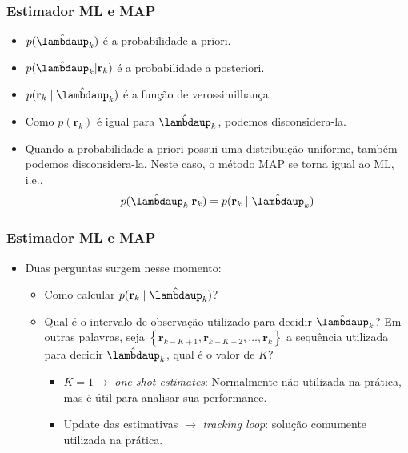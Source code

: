 \begin{frame}[t]
    \frametitle{Estimador ML e MAP}

    \begin{itemize}
        \item \(p(\hat{\boldsymbol{\lambdaup}}_k)\) é a probabilidade a priori.
        \item \(p(\hat{\boldsymbol{\lambdaup}}_k | \mathbf{r}_k)\) é a probabilidade a posteriori.
        \item \(p(\mathbf{r}_k \mid \hat{\boldsymbol{\lambdaup}}_k)\) é a função de verossimilhança.
    \end{itemize}

    \begin{itemize}
        \item Como \(p(\mathbf{r}_k)\) é igual para \(\hat{\boldsymbol{\lambdaup}}_k\), podemos disconsidera-la.
        \item Quando a probabilidade a priori possui uma distribuição uniforme, também podemos disconsidera-la. Neste caso, o método MAP se torna igual ao ML, i.e.,
        \begin{align}
            p(\hat{\boldsymbol{\lambdaup}}_k | \mathbf{r}_k) = p(\mathbf{r}_k \mid \hat{\boldsymbol{\lambdaup}}_k)
        \end{align}
    \end{itemize}
\end{frame}

\begin{frame}[t]
    \frametitle{Estimador ML e MAP}
    \begin{itemize}
        \item Duas perguntas surgem nesse momento:
        \begin{itemize}
            \item Como calcular \(p(\mathbf{r}_k \mid \hat{\boldsymbol{\lambdaup}}_k)\)?
            \item Qual é o intervalo de observação utilizado para decidir \(\hat{\boldsymbol{\lambdaup}}_k\)? Em outras palavras, seja \(\left\{ \mathbf{r}_{k-K+1}, \mathbf{r}_{k-K+2}, \dots, \mathbf{r}_{k} \right\}\) a sequência utilizada para decidir \(\hat{\boldsymbol{\lambdaup}}_k\), qual é o valor de \(K\)?
            \begin{itemize}
                \item \(K=1 \rightarrow\) \textit{one-shot estimates}: Normalmente não utilizada na prática, mas é útil para analisar sua performance.
                \item Update das estimativas \(\rightarrow\) \textit{tracking loop}: solução comumente utilizada na prática.
            \end{itemize}
        \end{itemize}
    \end{itemize}
\end{frame}

